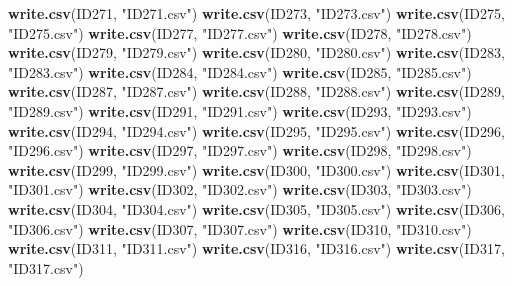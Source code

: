 \documentclass[
]{book}
\newenvironment{Shaded}{\begin{snugshade}}{\end{snugshade}}
\newcommand{\KeywordTok}[1]{\textcolor[rgb]{0.13,0.29,0.53}{\textbf{#1}}}
\newcommand{\NormalTok}[1]{#1}
\newcommand{\StringTok}[1]{\textcolor[rgb]{0.31,0.60,0.02}{#1}}
\begin{document}
\begin{Shaded}
\begin{Highlighting}[]
{{{{{{\KeywordTok{write.csv}\NormalTok{(ID271, }\StringTok{"ID271.csv"}\NormalTok{)}
\KeywordTok{write.csv}\NormalTok{(ID273, }\StringTok{"ID273.csv"}\NormalTok{)}
\KeywordTok{write.csv}\NormalTok{(ID275, }\StringTok{"ID275.csv"}\NormalTok{)}
\KeywordTok{write.csv}\NormalTok{(ID277, }\StringTok{"ID277.csv"}\NormalTok{)}
\KeywordTok{write.csv}\NormalTok{(ID278, }\StringTok{"ID278.csv"}\NormalTok{)}
\KeywordTok{write.csv}\NormalTok{(ID279, }\StringTok{"ID279.csv"}\NormalTok{)}
\KeywordTok{write.csv}\NormalTok{(ID280, }\StringTok{"ID280.csv"}\NormalTok{)}
\KeywordTok{write.csv}\NormalTok{(ID283, }\StringTok{"ID283.csv"}\NormalTok{)}
\KeywordTok{write.csv}\NormalTok{(ID284, }\StringTok{"ID284.csv"}\NormalTok{)}
\KeywordTok{write.csv}\NormalTok{(ID285, }\StringTok{"ID285.csv"}\NormalTok{)}
\KeywordTok{write.csv}\NormalTok{(ID287, }\StringTok{"ID287.csv"}\NormalTok{)}
\KeywordTok{write.csv}\NormalTok{(ID288, }\StringTok{"ID288.csv"}\NormalTok{)}
\KeywordTok{write.csv}\NormalTok{(ID289, }\StringTok{"ID289.csv"}\NormalTok{)}
\KeywordTok{write.csv}\NormalTok{(ID291, }\StringTok{"ID291.csv"}\NormalTok{)}
\KeywordTok{write.csv}\NormalTok{(ID293, }\StringTok{"ID293.csv"}\NormalTok{)}
\KeywordTok{write.csv}\NormalTok{(ID294, }\StringTok{"ID294.csv"}\NormalTok{)}
\KeywordTok{write.csv}\NormalTok{(ID295, }\StringTok{"ID295.csv"}\NormalTok{)}
\KeywordTok{write.csv}\NormalTok{(ID296, }\StringTok{"ID296.csv"}\NormalTok{)}
\KeywordTok{write.csv}\NormalTok{(ID297, }\StringTok{"ID297.csv"}\NormalTok{)}
\KeywordTok{write.csv}\NormalTok{(ID298, }\StringTok{"ID298.csv"}\NormalTok{)}
\KeywordTok{write.csv}\NormalTok{(ID299, }\StringTok{"ID299.csv"}\NormalTok{)}
\KeywordTok{write.csv}\NormalTok{(ID300, }\StringTok{"ID300.csv"}\NormalTok{)}
\KeywordTok{write.csv}\NormalTok{(ID301, }\StringTok{"ID301.csv"}\NormalTok{)}
\KeywordTok{write.csv}\NormalTok{(ID302, }\StringTok{"ID302.csv"}\NormalTok{)}
\KeywordTok{write.csv}\NormalTok{(ID303, }\StringTok{"ID303.csv"}\NormalTok{)}
\KeywordTok{write.csv}\NormalTok{(ID304, }\StringTok{"ID304.csv"}\NormalTok{)}
\KeywordTok{write.csv}\NormalTok{(ID305, }\StringTok{"ID305.csv"}\NormalTok{)}
\KeywordTok{write.csv}\NormalTok{(ID306, }\StringTok{"ID306.csv"}\NormalTok{)}
\KeywordTok{write.csv}\NormalTok{(ID307, }\StringTok{"ID307.csv"}\NormalTok{)}
\KeywordTok{write.csv}\NormalTok{(ID310, }\StringTok{"ID310.csv"}\NormalTok{)}
\KeywordTok{write.csv}\NormalTok{(ID311, }\StringTok{"ID311.csv"}\NormalTok{)}
\KeywordTok{write.csv}\NormalTok{(ID316, }\StringTok{"ID316.csv"}\NormalTok{)}
\KeywordTok{write.csv}\NormalTok{(ID317, }\StringTok{"ID317.csv"}\NormalTok{)}
}}}}}}
\end{Highlighting}
\end{Shaded}
\end{document}
